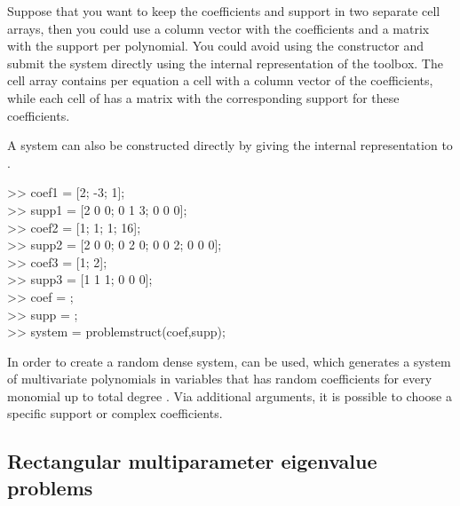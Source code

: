 \documentclass{manual}
\begin{document}
            Suppose that you want to keep the coefficients and support in two separate cell arrays, then you could use a column vector with the coefficients and a matrix with the support per polynomial.
            You could avoid using the  constructor and submit the system directly using the internal representation of the toolbox.
            The cell array  contains per equation a cell with a column vector of the coefficients, while each cell of  has a matrix with the corresponding support for these coefficients.
            \begin{code}
                A system can also be constructed directly by giving the internal representation to .
                \begin{codeblock}
                    >> coef1 = {[2; -3; 1]}; \\
                    >> supp1 = {[2 0 0; 0 1 3; 0 0 0]}; \\
                    >> coef2 = {[1; 1; 1; 16]}; \\
                    >> supp2 = {[2 0 0; 0 2 0; 0 0 2; 0 0 0]}; \\
                    >> coef3 = {[1; 2]}; \\
                    >> supp3 = {[1 1 1; 0 0 0]};\\
                    >> coef = ; \\
                    >> supp = ; \\
                    >> system = problemstruct(coef,supp);
                \end{codeblock}
            \end{code}

            In order to create a random dense system,  can be used, which generates a system of  multivariate polynomials in  variables that has random coefficients for every monomial up to total degree . 
            Via additional arguments, it is possible to choose a specific support or complex coefficients.

        \subsection{Rectangular multiparameter eigenvalue problems}
\end{document}
